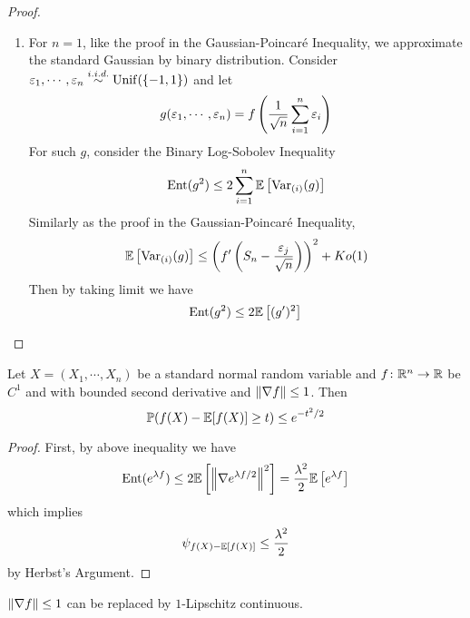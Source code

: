 \begin{enumerate}[label=\arabic{*}.]
\begin{proof}
\begin{enumerate}[label=\Roman*.]
	    	\item For $n =1$, like the proof in the Gaussian-Poincar\'e Inequality, we approximate the standard Gaussian by binary distribution. Consider $\varepsilon_1,\cdots,\varepsilon_n \stackrel{i.i.d.}{\sim} \operatorname{Unif}(\left\{-1,1\right\})$ and let 
	    	\begin{equation*}
	    	    g(\varepsilon_1,\cdots,\varepsilon_n) = f\left(\frac{1}{\sqrt{n}}\sum_{i=1}^n\varepsilon_i\right)
	    	\end{equation*}
	    	For such $g$, consider the Binary Log-Sobolev Inequality 
	    	\begin{equation*}
	    	    \operatorname{Ent}(g^2) \leq 2\sum_{i=1}^n\mathbb{E}\left[\operatorname{Var}_{(i)}(g)\right]
	    	\end{equation*}
	    	Similarly as the proof in the Gaussian-Poincar\'e Inequality,
	    	\begin{equation*}
	    	    \mathbb{E}\left[\operatorname{Var}_{(i)}(g)\right] \leq \left(f^{\prime}\left(S_n-\frac{\varepsilon_j}{\sqrt{n}}\right)\right)^2+K o(1)
	    	\end{equation*}
	    	Then by taking limit we have
	    	\begin{equation*}
	    	     \operatorname{Ent}(g^2) \leq 2\mathbb{E}\left[(g^\prime)^2\right] \qedhere
	    	\end{equation*}
	    \end{enumerate}
	\end{proof}
	\begin{cor}
	    Let $X=(X_1,\cdots,X_n)$ be a standard normal random variable and $f \colon \mathbb{R}^n \rightarrow \mathbb{R}$ be $C^1$ and with bounded second derivative and $\left\lVert\nabla f\right\lVert \leq 1$. Then
	    \begin{equation*}
	        \mathbb{P}(f(X) - \mathbb{E}[f(X)] \geq t) \leq e^{-t^2 / 2}
	    \end{equation*}
	\end{cor}
	\begin{proof}
	    First, by above inequality we have
	    \begin{equation*}
	        \operatorname{Ent}(e^{\lambda f}) \leq 2\mathbb{E}\left[\left\lVert\nabla e^{\lambda f /2}\right\lVert^2\right] = \frac{\lambda^2}{2} \mathbb{E}\left[e^{\lambda f}\right]
	    \end{equation*}
	    which implies
	    \begin{equation*}
	        \psi_{f(X) - \mathbb{E}[f(X)]} \leq \frac{\lambda^2}{2}
	    \end{equation*}
	    by Herbst’s Argument.
	\end{proof}
	\begin{rmk}
	    $\left\lVert\nabla f\right\lVert \leq 1$ can be replaced by $1$-Lipschitz continuous.
	\end{rmk}
\end{enumerate}




	